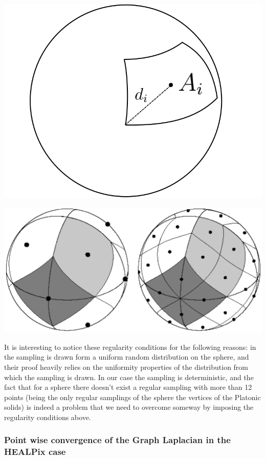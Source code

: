 \begin{minipage}{.5\textwidth}
	\centering
	\includegraphics[width=0.4\linewidth]{figs/chapter1/d_iA_i.png}
	\label{fig:Geometric characteristics of a patch}
\end{minipage}%
\begin{minipage}{.5\textwidth}
	\centering
	\includegraphics[width=0.7\linewidth]{figs/chapter1/Heal_Base.png}
	\label{fig:HEALPix equal areas patches}
	\vspace{0.5cm}
\end{minipage}

It is interesting to notice these regularity conditions for the following reasons: in \cite{Belkin:2005:TTF:2138147.2138189} the sampling is drawn form a uniform random distribution on the sphere, and their proof heavily relies on the uniformity properties of the distribution from which the sampling is drawn. In our case the sampling is deterministic, and the fact that for a sphere there doesn't exist a regular sampling with more than 12 points (being the only regular samplings of the sphere the vertices of the Platonic solids) is indeed a problem that we need to overcome someway by imposing the regularity conditions above. 

\subsubsection{Point wise convergence of the Graph Laplacian in the HEALPix case}

